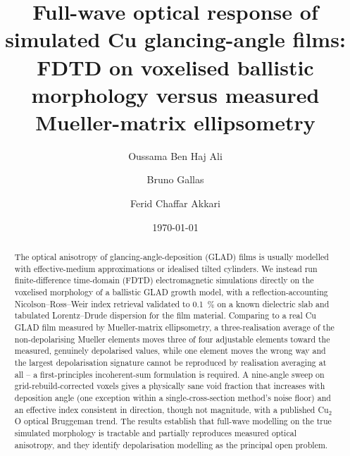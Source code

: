 \documentclass[aip,jcp,amsmath,amssymb,reprint]{revtex4-1}
\begin{document}
\title{Full-wave optical response of simulated Cu glancing-angle films:
FDTD on voxelised ballistic morphology versus measured Mueller-matrix
ellipsometry}

\author{Oussama Ben Haj Ali}
\author{Bruno Gallas}
\author{Ferid Chaffar Akkari}

\date{\today}

\begin{abstract}
The optical anisotropy of glancing-angle-deposition (GLAD) films is usually
modelled with effective-medium approximations or idealised tilted cylinders. We
instead run finite-difference time-domain (FDTD) electromagnetic simulations
directly on the voxelised morphology of a ballistic GLAD growth model, with a
reflection-accounting Nicolson--Ross--Weir index retrieval validated to
\SI{0.1}{\percent} on a known dielectric slab and tabulated Lorentz--Drude
dispersion for the film material. Comparing to a real Cu GLAD film measured by
Mueller-matrix ellipsometry, a three-realisation average of the non-depolarising
Mueller elements moves three of four adjustable elements toward the measured,
genuinely depolarised values, while one element moves the wrong way and the
largest depolarisation signature cannot be reproduced by realisation averaging
at all -- a first-principles incoherent-sum formulation is required. A
nine-angle sweep on grid-rebuild-corrected voxels gives a physically sane void
fraction that increases with deposition angle (one exception within a
single-cross-section method's noise floor) and an effective index consistent in
direction, though not magnitude, with a published Cu$_2$O optical Bruggeman
trend. The results establish that full-wave modelling on the true simulated
morphology is tractable and partially reproduces measured optical anisotropy,
and they identify depolarisation modelling as the principal open problem.
\end{abstract}

\maketitle
\end{document}
